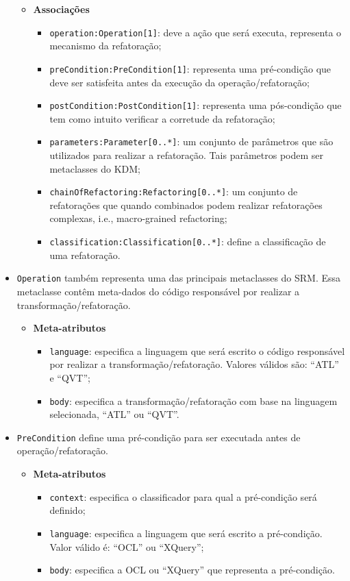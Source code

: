 \begin{itemize}
\begin{itemize}
	\item \textbf{Associações}
		\begin{itemize}
			\item \texttt{operation:Operation[1]}: deve a ação que será executa, representa o mecanismo da refatoração;
			\item \texttt{preCondition:PreCondition[1]}: representa uma pré-condição que deve ser satisfeita antes da execução da operação/refatoração;
			\item \texttt{postCondition:PostCondition[1]}: representa uma pós-condição que tem como intuito verificar a corretude da refatoração;
			\item \texttt{parameters:Parameter[0..*]}: um conjunto de parâmetros que são utilizados para realizar a refatoração. Tais parâmetros podem ser metaclasses do KDM;
			\item \texttt{chainOfRefactoring:Refactoring[0..*]}: um conjunto de refatorações que quando combinados podem realizar refatorações complexas, i.e., macro-grained refactoring;
			\item \texttt{classification:Classification[0..*]}: define a classificação de uma refatoração.
		\end{itemize}	
\end{itemize} 

\item \texttt{Operation} também representa uma das principais metaclasses do SRM. Essa metaclasse contêm meta-dados do código responsável por realizar a transformação/refatoração.

\begin{itemize}
	\item \textbf{Meta-atributos}
		\begin{itemize}
			\item \texttt{language}: especifica a linguagem que será escrito o código responsável por realizar a transformação/refatoração. Valores válidos são: ``ATL'' e ``QVT'';
			\item \texttt{body}: especifica a transformação/refatoração com base na linguagem selecionada, ``ATL'' ou ``QVT''.
		\end{itemize}	
\end{itemize} 

\item \texttt{PreCondition} define uma pré-condição para ser executada antes de operação/refatoração.

\begin{itemize}
	\item \textbf{Meta-atributos}
		\begin{itemize}
			\item \texttt{context}: especifica o classificador para qual a pré-condição será definido;
			\item \texttt{language}: especifica a linguagem que será escrito a pré-condição. Valor válido é: ``OCL'' ou ``XQuery'';
			\item \texttt{body}: especifica a OCL ou ``XQuery'' que representa a pré-condição.
		\end{itemize}	
\end{itemize} 


\end{itemize}

